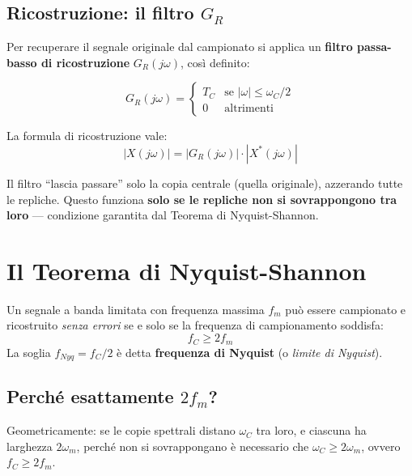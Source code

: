 \documentclass[12pt,a4paper]{article}
\begin{document}
\subsection{Ricostruzione: il filtro $G_R$}

Per recuperare il segnale originale dal campionato si applica un \textbf{filtro passa-basso di
ricostruzione} $G_R(j\omega)$, così definito:

\begin{equation}
  G_R(j\omega) =
  \begin{cases}
    T_C & \text{se } |\omega| \leq \omega_C / 2 \\
    0   & \text{altrimenti}
  \end{cases}
\end{equation}

La formula di ricostruzione vale:
\begin{equation}
  \boxed{|X(j\omega)| = |G_R(j\omega)| \cdot |X^*(j\omega)|}
\end{equation}

Il filtro ``lascia passare'' solo la copia centrale (quella originale), azzerando tutte le repliche.
Questo funziona \textbf{solo se le repliche non si sovrappongono tra loro} — condizione garantita
dal Teorema di Nyquist-Shannon.

\section{Il Teorema di Nyquist-Shannon}

\begin{definitionbox}
Un segnale a banda limitata con frequenza massima $f_m$ può essere campionato e ricostruito
\emph{senza errori} se e solo se la frequenza di campionamento soddisfa:
\begin{equation}
  \boxed{f_C \geq 2 f_m}
\end{equation}
La soglia $f_{Nyq} = f_C / 2$ è detta \textbf{frequenza di Nyquist} (o \emph{limite di Nyquist}).
\end{definitionbox}

\subsection{Perché esattamente $2f_m$?}

Geometricamente: se le copie spettrali distano $\omega_C$ tra loro, e ciascuna ha larghezza
$2\omega_m$, perché non si sovrappongano è necessario che $\omega_C \geq 2\omega_m$, ovvero
$f_C \geq 2f_m$.
\end{document}
